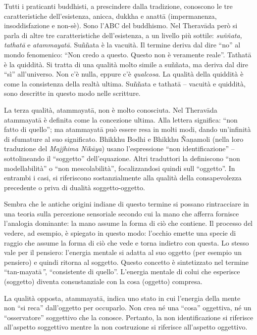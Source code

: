 Tutti i praticanti buddhisti, a prescindere dalla tradizione, conoscono le tre caratteristiche dell'esistenza, anicca, dukkha e anattā (impermanenza, insoddisfazione e non-sè). Sono l'ABC del buddhismo. Nel Theravāda però si parla di altre tre caratteristiche dell'esistenza, a un livello più sottile: \textit{suññata, tathatā }e\textit{ atammayatā}. Suññata è la vacuità. Il termine deriva dal dire ``no'' al mondo fenomenico: ``Non credo a questo. Questo non è veramente reale''. Tathatā è la quiddità. Si tratta di una qualità molto simile a suññata, ma deriva dal dire ``sì'' all'universo. Non c'è nulla, eppure c'è \textit{qualcosa}. La qualità della quiddità è come la consistenza della realtà ultima. Suññata e tathatā – vacuità e quiddità, sono descritte in questo modo nelle scritture.

La terza qualità, atammayatā, non è molto conosciuta. Nel Theravāda atammayatā è definita come la concezione ultima. Alla lettera significa: ``non fatto di quello''; ma atammayatā può essere resa in molti modi, dando un'infinità di sfumature al suo significato. Bhikkhu Bodhi e Bhikkhu Ñaṇamoli (nella loro traduzione del \textit{Majjhima Nikāya}) usano l'espressione ``non identificazione'' – sottolineando il ``soggetto'' dell'equazione. Altri traduttori la definiscono ``non modellabilità'' o ``non mescolabilità'', focalizzandosi quindi sull ``oggetto''. In entrambi i casi, si riferiscono sostanzialmente alla qualità della consapevolezza precedente o priva di dualità soggetto-oggetto.

Sembra che le antiche origini indiane di questo termine si possano rintracciare in una teoria sulla percezione sensoriale secondo cui la mano che afferra fornisce l'analogia dominante: la mano assume la forma di ciò che contiene. Il processo del vedere, ad esempio, è spiegato in questo modo: l'occhio emette una specie di raggio che assume la forma di ciò che vede e torna indietro con questa. Lo stesso vale per il pensiero: l'energia mentale si adatta al suo oggetto (per esempio un pensiero) e quindi ritorna al soggetto. Questo concetto è sintetizzato nel termine ``tan-mayatā\textit{''}, ``consistente di quello''. L'energia mentale di colui che esperisce (soggetto) diventa consustanziale con la cosa (oggetto) compresa. 

La qualità opposta, atammayatā, indica uno stato in cui l'energia della mente non ``si reca'' dall'oggetto per occuparlo. Non crea né una ``cosa'' oggettiva, né un ``osservatore'' soggettivo che la conosce. Pertanto, la non identificazione si riferisce all'aspetto soggettivo mentre la non costruzione si riferisce all'aspetto oggettivo.

